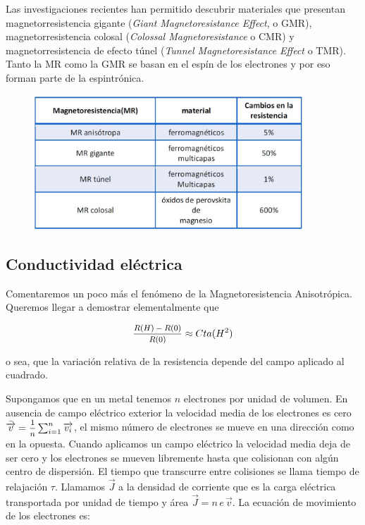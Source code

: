 Las investigaciones recientes han permitido descubrir materiales que presentan magnetorresistencia gigante (\textit{Giant Magnetoresistance Effect}, o GMR), magnetorresistencia colosal (\textit{Colossal Magnetoresistance} o CMR) y magnetorresistencia de efecto túnel (\textit{Tunnel Magnetoresistance Effect} o TMR). Tanto la MR como la GMR se basan en el espín de los electrones y por eso forman parte de la espintrónica.

\begin{figure}[H]
    \centering
    \includegraphics[width=0.9\textwidth]{./Figures/fig318}
	\label{fig:318}
\end{figure}

\subsection{Conductividad eléctrica}

Comentaremos un poco más el fenómeno de la Magnetoresistencia Anisotrópica. Queremos llegar a demostrar elementalmente que

\begin{equation}
	\mfrac{R(H)-R(0)}{R(0)}\approx Cta(H^{2})
\end{equation}

o sea, que la variación relativa de la resistencia depende del campo aplicado al cuadrado.

Supongamos que en un metal tenemos $n$ electrones por unidad de volumen. En ausencia de campo eléctrico exterior la velocidad media de los electrones es cero $\bar{\overrightarrow{v}}=\mfrac{1}{n}\sum_{i=1}^{n} \overrightarrow{v_{i}}$, el mismo número de electrones se mueve en una dirección como en la opuesta. Cuando aplicamos un campo eléctrico la velocidad media deja de ser cero y los electrones se mueven libremente hasta que colisionan con algún centro de dispersión. El tiempo que transcurre entre colisiones se llama tiempo de relajación $\tau$. Llamamos $\overrightarrow{J}$ a la densidad de corriente que es la carga eléctrica transportada por unidad de tiempo y área $\overrightarrow{J}=n\,e\,\overrightarrow{v}$. La ecuación de movimiento de los electrones es:

